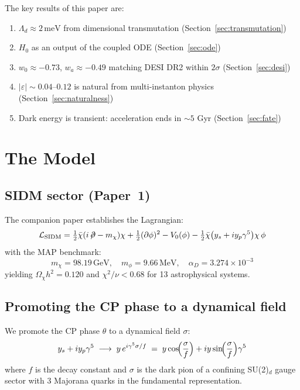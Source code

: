 \documentclass[11pt,a4paper]{article}
\newcommand{\Ld}{\Lambda_d}
\newcommand{\meV}{\,\mathrm{meV}}
\newcommand{\GeV}{\,\mathrm{GeV}}
\newcommand{\MeV}{\,\mathrm{MeV}}
\begin{document}
The key results of this paper are:
\begin{enumerate}[nosep]
  \item $\Ld \approx 2\meV$ from dimensional transmutation (Section~\ref{sec:transmutation})
  \item $H_0$ as an output of the coupled ODE (Section~\ref{sec:ode})
  \item $w_0 \approx -0.73$, $w_a \approx -0.49$ matching DESI DR2 within $2\sigma$ (Section~\ref{sec:desi})
  \item $|\varepsilon| \sim 0.04$--$0.12$ is natural from multi-instanton physics (Section~\ref{sec:naturalness})
  \item Dark energy is transient: acceleration ends in $\sim5$ Gyr (Section~\ref{sec:fate})
\end{enumerate}

\section{The Model}
\label{sec:model}

\subsection{SIDM sector (Paper~1)}

The companion paper establishes the Lagrangian:
\begin{equation}\label{eq:lag}
\mathcal{L}_{\mathrm{SIDM}} = \tfrac{1}{2}\bar\chi(i\!\not\!\partial - m_\chi)\chi 
+ \tfrac{1}{2}(\partial\phi)^2 - V_0(\phi) 
- \tfrac{1}{2}\bar\chi\bigl(y_s + iy_p\gamma^5\bigr)\chi\,\phi
\end{equation}
with the MAP benchmark:
\begin{equation}
  m_\chi = 98.19\GeV, \quad m_\phi = 9.66\MeV, \quad \alpha_D = 3.274 \times 10^{-3}
\end{equation}
yielding $\Omega_\chi h^2 = 0.120$ and $\chi^2/\nu < 0.68$ for 13 astrophysical systems.

\subsection{Promoting the CP phase to a dynamical field}

We promote the CP phase $\theta$ to a dynamical field $\sigma$:
\begin{equation}\label{eq:promotion}
  y_s + iy_p\gamma^5 \;\longrightarrow\; y\,e^{i\gamma^5\sigma/f}
  \;=\; y\cos\!\Bigl(\frac{\sigma}{f}\Bigr) + iy\sin\!\Bigl(\frac{\sigma}{f}\Bigr)\gamma^5
\end{equation}
where $f$ is the decay constant and $\sigma$ is the dark pion of a confining SU(2)$_d$ gauge sector 
with 3 Majorana quarks in the fundamental representation.
\end{document}
